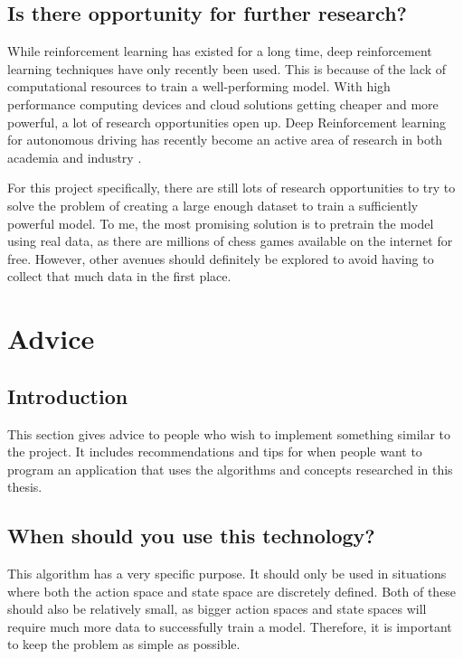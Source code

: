 \documentclass{article}
\begin{document}
\subsection{Is there opportunity for further research?}

While reinforcement learning has existed for a long time, deep reinforcement learning techniques 
have only recently been used. This is because of the lack of computational resources to train
a well-performing model. With high performance computing devices and cloud solutions getting cheaper
and more powerful, a lot of research opportunities open up.
Deep Reinforcement learning for autonomous driving has recently become an active area of research 
in both academia and industry \cite{DeepReinforcementLearning2022a}.

For this project specifically, there are still lots of research opportunities to try to solve the problem
of creating a large enough dataset to train a sufficiently powerful model. To me, the most promising solution is to
pretrain the model using real data, as there are millions of chess games available on the internet for free.
However, other avenues should definitely be explored to avoid having to collect that much data in the first place.

\newpage
\section{Advice}

\subsection{Introduction}

This section gives advice to people who wish to implement something similar to the project.
It includes recommendations and tips for when people want to program an application that uses
the algorithms and concepts researched in this thesis.

\subsection{When should you use this technology?}

This algorithm has a very specific purpose. It should only be used in situations where
both the action space and state space are discretely defined. Both of these should also
be relatively small, as bigger action spaces and state spaces will require much more 
data to successfully train a model. 
Therefore, it is important to keep the problem as simple as possible. 
\end{document}
